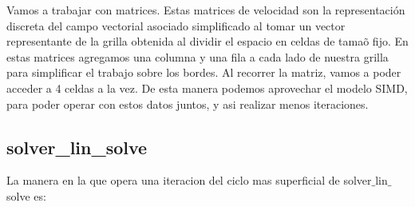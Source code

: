 Vamos a trabajar con matrices. Estas matrices de velocidad son la representaci\'on discreta del campo vectorial asociado simplificado al tomar un vector representante de la grilla obtenida al dividir el espacio en celdas de tama\~o fijo. En estas matrices agregamos una columna y una fila a cada lado de nuestra grilla para simplificar el trabajo sobre los bordes.
Al recorrer la matriz, vamos a poder acceder a 4 celdas a la vez. De esta manera podemos aprovechar el modelo SIMD, para poder operar con estos datos juntos, y asi realizar menos iteraciones.

\subsection{solver\_lin\_solve}
La manera en la que opera una iteracion del ciclo mas superficial de solver$\_$lin$\_$solve es:
